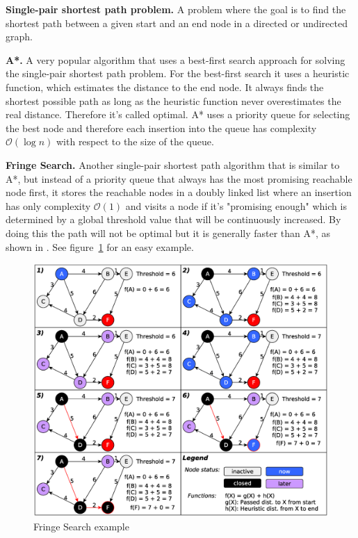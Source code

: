 \documentclass[letterpaper]{article}
\newcommand{\mypar}[1]{{\bf #1.}}
\begin{document}
\mypar{Single-pair shortest path problem}
A problem where the goal is to find the shortest path between a given start and an end node in a directed or undirected graph.

\mypar{A*}
A very popular algorithm that uses a best-first search approach for solving the single-pair shortest path problem. For the best-first search it uses a heuristic function, which estimates the distance to the end node. It always finds the shortest possible path as long as the heuristic function never overestimates the real distance. Therefore it's called optimal. A* uses a priority queue for selecting the best node and therefore each insertion into the queue has complexity $\mathcal{O}(\log n)$ with respect to the size of the queue.

\mypar{Fringe Search}
Another single-pair shortest path algorithm that is similar to A*, but instead of a priority queue that always has the most promising reachable node first, it stores the reachable nodes in a doubly linked list where an insertion has only complexity $\mathcal{O}(1)$ and visits a node if it's "promising enough" which is determined by a global threshold value that will be continuously increased. By doing this the path will not be optimal but it is generally faster than A*, as shown in \cite{fringe:05}. See figure~\ref{fig:algo} for an easy example.
\begin{figure}[h]\centering
  \includegraphics[scale=0.245]{fringe_rep.eps}
  \caption{Fringe Search example \label{fig:algo}}
\end{figure}
\end{document}
